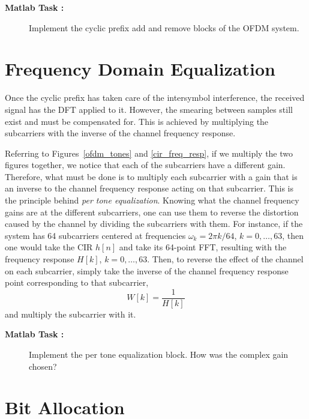 \documentclass[12pt]{article}
\newcounter{matlabcnt}
\begin{document}
\begin{description}
    \item[{\bf Matlab Task :}]
    Implement the cyclic prefix add and remove blocks of the OFDM
    system.
\end{description}


\section{Frequency Domain Equalization}\label{sceq}

Once the cyclic prefix has taken care of the intersymbol
interference, the received signal has the DFT applied to it.
However, the smearing between samples still exist and must be
compensated for. This is achieved by multiplying the subcarriers
with the inverse of the channel frequency response.

Referring to Figures~\ref{ofdm_tones} and \ref{cir_freq_resp}, if
we multiply the two figures together, we notice that each of the
subcarriers have a different gain. Therefore, what must be done is
to multiply each subcarrier with a gain that is an inverse to the
channel frequency response acting on that subcarrier. This is the
principle behind {\it per tone equalization}. Knowing what the
channel frequency gains are at the different subcarriers, one can
use them to reverse the distortion caused by the channel by
dividing the subcarriers with them. For instance, if the system
has 64 subcarriers centered at frequencies $\omega_k=2\pi{k}/64$,
$k=0,\ldots,63$, then one would take the CIR $h[n]$ and take its
64-point FFT, resulting with the frequency response $H[k]$,
$k=0,\ldots,63$. Then, to reverse the effect of the channel on
each subcarrier, simply take the inverse of the channel frequency
response point corresponding to that subcarrier,
\begin{equation}
W[k]=\frac{1}{H[k]}
\end{equation}
and multiply the subcarrier with it.

\begin{description}
    \item[{\bf Matlab Task :}]
    Implement the per tone equalization block. How was the complex gain chosen?
\end{description}



\section{Bit Allocation}
\end{document}
